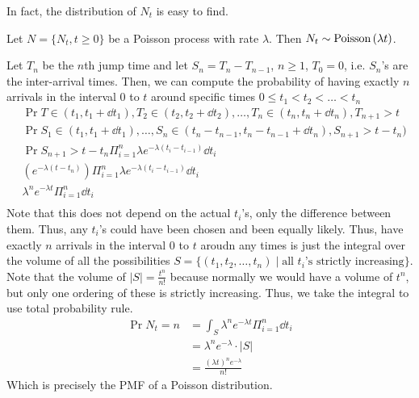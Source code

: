 In fact, the distribution of $N_t$ is easy to find.
\begin{theorem}
    Let $N = \{N_t, t \geq 0\}$ be a Poisson process with rate $\lambda$. Then $N_t \sim \text{Poisson}\left( \lambda t \right)$.

    \begin{proof*}
        Let $T_n$ be the $n$th jump time and let $S_n = T_n - T_{n - 1}$, $n \geq 1$, $T_0 = 0$,
        i.e. $S_n$'s are the inter-arrival times. Then, we can compute the probability of having exactly $n$ arrivals
        in the interval 0 to $t$ around specific times $0 \leq t_1 < t_2 < \dots < t_n$
        \begin{align*}
            &\Pr{T \in (t_1, t_1 + \dd{t_1}), T_2 \in (t_2, t_2 + \dd{t_2}), \dots, T_n \in (t_n, t_n + \dd{t_n}), T_{n + 1} > t} \\
            &\Pr{S_1 \in (t_1, t_1 + \dd{t_1}), \dots, S_n \in (t_n - t_{n - 1}, t_{n} - t_{n - 1} + \dd{t_n}), S_{n + 1} > t - t_n)} \\
            &\Pr{S_{n + 1} > t - t_n} \Pi_{i = 1}^n \lambda e^{-\lambda (t_i - t_{i - 1})} \dd{t_i} \\
            &(e^{-\lambda(t - t_n)}) \Pi_{i = 1}^n \lambda e^{-\lambda (t_i - t_{i - 1})} \dd{t_i} \\
            & \lambda^n e^{-\lambda t} \Pi_{i = 1}^n \dd{t_i} \\
        \end{align*}
        Note that this does not depend on the actual $t_i$'s, only the difference between them. Thus,
        any $t_i$'s could have been chosen and been equally likely. Thus, have exactly $n$ arrivals in the interval 0 to $t$
        aroudn any times is just the integral over the volume of all the possibilities $S = \{(t_1, t_2, \dots, t_n) \mid \text{all $t_i$'s strictly increasing}\}$. 
        Note that the volume of $|S| = \frac{t^n}{n!}$ because normally we would have a volume of $t^n$, but only one ordering of these is strictly increasing.
        Thus, we take the integral to use total probability rule.
        \begin{align*}
            \Pr{N_t = n} &= \int_{S} \lambda^n e^{-\lambda t} \Pi_{i = 1}^n \dd{t_i} \\
            &= \lambda^n e^{-\lambda} \cdot |S| \\
            &= \frac{(\lambda t)^n e^{-\lambda}}{n!}
        \end{align*}
        Which is precisely the PMF of a Poisson distribution.
    \end{proof*}
\end{theorem}

